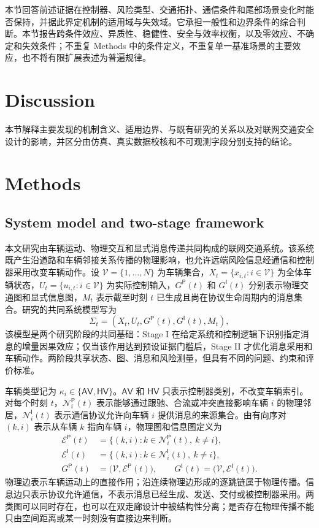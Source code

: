 \documentclass[10pt,a4paper,twocolumn]{article}
\begin{document}
本节回答前述证据在控制器、风险类型、交通拓扑、通信条件和尾部场景变化时能否保持，并据此界定机制的适用域与失效域。它承担一般性和边界条件的综合判断。本节报告跨条件效应、异质性、稳健性、安全与效率权衡，以及零效应、不确定和失效条件；不重复 Methods 中的条件定义，不重复单一基准场景的主要效应，也不将有限扩展表述为普遍规律。

\section*{Discussion}
本节解释主要发现的机制含义、适用边界、与既有研究的关系以及对联网交通安全设计的影响，并区分由仿真、真实数据校核和不可观测字段分别支持的结论。

\section*{Methods}
\subsection*{System model and two-stage framework}
本文研究由车辆运动、物理交互和显式消息传递共同构成的联网交通系统。该系统既产生沿道路和车辆邻接关系传播的物理影响，也允许远端风险信息经通信和控制器采用改变车辆动作。设 $\mathcal V=\{1,\ldots,N\}$ 为车辆集合，$X_t=\{x_{i,t}:i\in\mathcal V\}$ 为全体车辆状态，$U_t=\{u_{i,t}:i\in\mathcal V\}$ 为实际控制输入，$G^{\mathsf P}(t)$ 和 $G^{\mathsf I}(t)$ 分别表示物理交通图和显式信息图，$M_t$ 表示截至时刻 $t$ 已生成且尚在协议生命周期内的消息集合。研究的共同系统模型写为
\begin{equation}
\Sigma_t=\left(X_t,U_t,G^{\mathsf P}(t),G^{\mathsf I}(t),M_t\right),
\end{equation}
该模型是两个研究阶段的共同基础：Stage I 在给定系统和控制逻辑下识别指定消息的增量因果效应；仅当该作用达到预设证据门槛后，Stage II 才优化消息采用和车辆动作。两阶段共享状态、图、消息和风险测量，但具有不同的问题、约束和评价标准。

车辆类型记为 $\kappa_i\in\{\mathsf{AV},\mathsf{HV}\}$。$\mathsf{AV}$ 和 $\mathsf{HV}$ 只表示控制器类别，不改变车辆索引。对每个时刻 $t$，$\mathcal{N}_i^{\mathsf P}(t)$ 表示能够通过跟驰、合流或冲突直接影响车辆 $i$ 的物理邻居，$\mathcal{N}_i^{\mathsf I}(t)$ 表示通信协议允许向车辆 $i$ 提供消息的来源集合。由有向序对 $(k,i)$ 表示从车辆 $k$ 指向车辆 $i$，物理图和信息图定义为
\begin{equation}
\begin{aligned}
\mathcal{E}^{\mathsf P}(t)&=\{(k,i):k\in\mathcal{N}_i^{\mathsf P}(t),\ k\neq i\},\\
\mathcal{E}^{\mathsf I}(t)&=\{(k,i):k\in\mathcal{N}_i^{\mathsf I}(t),\ k\neq i\},\\
G^{\mathsf P}(t)&=\bigl(\mathcal{V},\mathcal{E}^{\mathsf P}(t)\bigr),\qquad
G^{\mathsf I}(t)=\bigl(\mathcal{V},\mathcal{E}^{\mathsf I}(t)\bigr).
\end{aligned}
\end{equation}
物理边表示车辆运动上的直接作用；沿连续物理边形成的逐跳链属于物理传播。信息边只表示协议允许通信，不表示消息已经生成、发送、交付或被控制器采用。两类图可以同时存在，也可以在双走廊设计中被结构性分离；是否存在物理传播不能只由空间距离或某一时刻没有直接边来判断。
\end{document}
